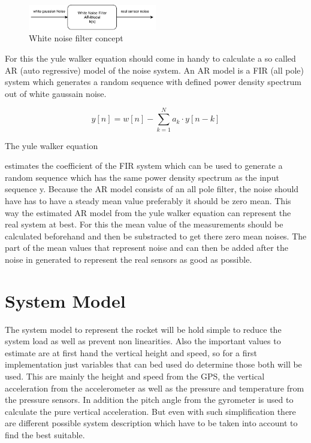   \begin{figure}[h!]
 \centering
 \includegraphics[width=0.5\textwidth]{./Pictures/WhiteNoiseFilter.pdf}
 \caption{White noise filter concept}
 \label{fig:WhiteNoiseFilter}
\end{figure}
  
  
  For this the yule walker equation should come in handy to calculate a so called AR (auto regressive) model of the noise system.
  An AR model is a FIR (all pole) system which generates a random sequence with defined power density spectrum out of white gaussain noise.
  
  $$ y[n] = w[n] - \sum_{k=1}^{N} a_k \cdot y[n-k]  $$
  
  The yule walker equation
  
  estimates the coefficient of the FIR system which can be used to generate a random sequence which has the same power density spectrum as the input sequence y.
  Because the AR model consists of an all pole filter, the noise should have has to have a steady mean value preferably it should be zero mean.
  This way the estimated AR model from the yule walker equation can represent the real system at best.
  For this the mean value of the measurements should be calculated beforehand and then be substracted to get there zero mean noises.
  The part of the mean values that represent noise and can then be added after the noise in generated to represent the real sensors as good as possible.
  
  \section{System Model}
  The system model to represent the rocket will be hold simple to reduce the system load as well as prevent non linearities.
  Also the important values to estimate are at first hand the vertical height and speed, so
  for a first implementation just variables that can bed used do determine those both will be used.
  This are mainly the height and speed from the GPS, the vertical acceleration from the accelerometer
  as well as the pressure and temperature from the pressure sensors. In addition the pitch angle from the gyrometer is used to calculate the pure vertical acceleration.
  But even with such simplification there are different possible system description which have to be taken into account 
  to find the best suitable.
  
